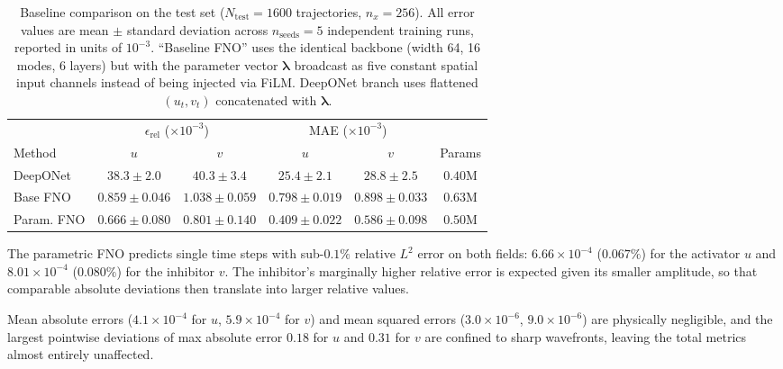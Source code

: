 \documentclass[runningheads]{llncs}
\begin{document}
\begin{table}[!ht]
\begin{center}
\begin{scriptsize}
\begin{sc}
\setlength{\tabcolsep}{5pt}
\begin{tabular}{lccccc}
\toprule
 & \multicolumn{2}{c}{$\epsilon_{\text{rel}}$ ($\times 10^{-3}$)} & \multicolumn{2}{c}{MAE ($\times 10^{-3}$)} & \\
\cmidrule(lr){2-3} \cmidrule(lr){4-5}
Method & $u$ & $v$ & $u$ & $v$ & Params \\
\midrule
DeepONet
  & $38.3 \pm 2.0$ & $40.3 \pm 3.4$
  & $25.4 \pm 2.1$ & $28.8 \pm 2.5$
  & $0.40$M \\
Base FNO
  & $0.859 \pm 0.046$ & $1.038 \pm 0.059$
  & $0.798 \pm 0.019$ & $0.898 \pm 0.033$
  & $0.63$M \\
Param. FNO
  & $\bm{0.666 \pm 0.080}$ & $\bm{0.801 \pm 0.140}$
  & $\bm{0.409 \pm 0.022}$ & $\bm{0.586 \pm 0.098}$
  & $0.50$M \\
\bottomrule
\end{tabular}
\end{sc}
\end{scriptsize}
\end{center}
\smallskip
\caption{Baseline comparison on the test set ($N_{\text{test}} = 1600$
trajectories, $n_x = 256$). All error values are mean $\pm$ standard deviation
across $n_{\text{seeds}} = 5$ independent training runs, reported in units of
$10^{-3}$. ``Baseline FNO'' uses the identical backbone (width 64, 16 modes,
6 layers) but with the parameter vector $\bm{\lambda}$ broadcast as five constant
spatial input channels instead of being injected via FiLM. DeepONet branch uses
flattened $(u_t, v_t)$ concatenated with $\bm{\lambda}$.}
\label{tab:baselines}
\end{table}

The parametric FNO predicts single time steps with sub-$0.1\%$ relative $L^2$ error on both fields: $6.66 \times 10^{-4}$ ($0.067\%$) for the activator $u$ and $8.01 \times 10^{-4}$ ($0.080\%$) for the inhibitor $v$. The inhibitor's marginally higher relative error is expected given its smaller amplitude, so that comparable absolute deviations then translate into larger relative values.

Mean absolute errors ($4.1 \times 10^{-4}$ for $u$, $5.9 \times 10^{-4}$ for $v$) and mean squared errors ($3.0 \times 10^{-6}$, $9.0 \times 10^{-6}$) are physically negligible, and the largest pointwise deviations of max absolute error $0.18$ for $u$ and $0.31$ for $v$ are confined to sharp wavefronts, leaving the total metrics almost entirely unaffected.
\end{document}
